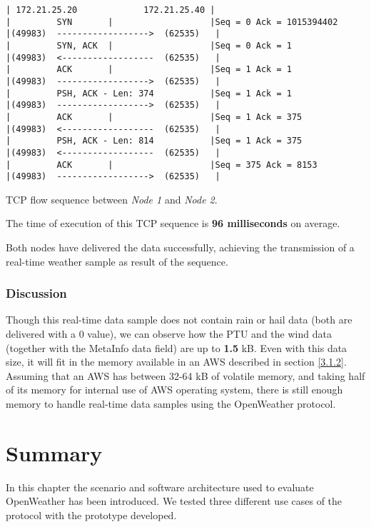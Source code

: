 \begin{table}[H]
\begin{minipage}[t]{\linewidth}
\begin{verbatim}
| 172.21.25.20             172.21.25.40 |
|         SYN       |                   |Seq = 0 Ack = 1015394402
|(49983)  ------------------>  (62535)   |
|         SYN, ACK  |                   |Seq = 0 Ack = 1
|(49983)  <------------------  (62535)   |
|         ACK       |                   |Seq = 1 Ack = 1
|(49983)  ------------------>  (62535)   |
|         PSH, ACK - Len: 374           |Seq = 1 Ack = 1
|(49983)  ------------------>  (62535)   |
|         ACK       |                   |Seq = 1 Ack = 375
|(49983)  <------------------  (62535)   |
|         PSH, ACK - Len: 814           |Seq = 1 Ack = 375
|(49983)  <------------------  (62535)   |
|         ACK       |                   |Seq = 375 Ack = 8153
|(49983)  ------------------>  (62535)   |
\end{verbatim}
\end{minipage}
\caption{\protect \gls{TCP} flow sequence between \emph{Node 1} and \emph{Node 2}.}
\end{table}
The time of execution of this \gls{TCP} sequence is \textbf{96 milliseconds} on average.

Both nodes have delivered the data successfully, achieving the transmission of a real-time weather sample as result of the sequence.

\subsubsection{Discussion}

Though this real-time data sample does not contain rain or hail data (both are delivered with a 0 value), we can observe how the \gls{PTU} and the wind data (together with the MetaInfo data field) are up to \textbf{1.5} \gls{kB}. 
Even with this data size, it will fit in the memory available in an \gls{AWS} described in section \ref{3.1.2}. Assuming that an \gls{AWS} has between 32-64 \gls{kB} of volatile memory, and taking half of its memory for internal use of \gls{AWS} operating system, there is still enough memory to handle real-time data samples using the OpenWeather protocol.

\section{Summary}

In this chapter the scenario and software architecture used to evaluate OpenWeather has been introduced.
We tested three different use cases of the protocol with the prototype developed. 

